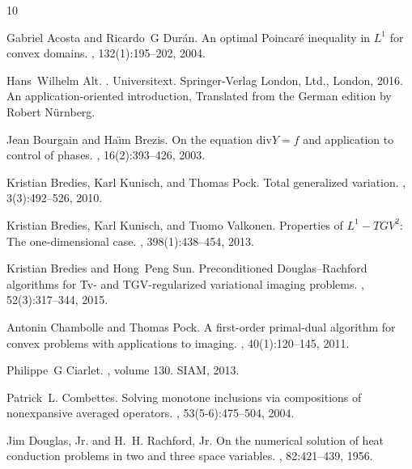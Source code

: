 \documentclass[twocolumn,envcountsame]{svjour3}
\begin{document}
\begin{thebibliography}{10}

Gabriel Acosta and Ricardo~G Dur{\'a}n.
\newblock An optimal {P}oincar{\'e} inequality in {$L^1$} for convex domains.
,
  132(1):195--202, 2004.

Hans~Wilhelm Alt.
.
\newblock Universitext. Springer-Verlag London, Ltd., London, 2016.
\newblock An application-oriented introduction, Translated from the German
  edition by Robert N\"urnberg.

Jean Bourgain and Ha{\"\i}m Brezis.
\newblock On the equation $\mathrm{div} {Y}= f$ and application to control of
  phases.
, 16(2):393--426,
  2003.

Kristian Bredies, Karl Kunisch, and Thomas Pock.
\newblock Total generalized variation.
, 3(3):492--526, 2010.

Kristian Bredies, Karl Kunisch, and Tuomo Valkonen.
\newblock Properties of {$L^1-TGV^2$}: The one-dimensional case.
,
  398(1):438--454, 2013.

Kristian Bredies and Hong~Peng Sun.
\newblock Preconditioned {D}ouglas--{R}achford algorithms for {T}v- and
  {TGV}-regularized variational imaging problems.
, 52(3):317--344,
  2015.

Antonin Chambolle and Thomas Pock.
\newblock A first-order primal-dual algorithm for convex problems with
  applications to imaging.
, 40(1):120--145,
  2011.

Philippe~G Ciarlet.
,
  volume 130.
\newblock SIAM, 2013.

Patrick~L. Combettes.
\newblock Solving monotone inclusions via compositions of nonexpansive averaged
  operators.
, 53(5-6):475--504, 2004.

Jim Douglas, Jr. and H.~H. Rachford, Jr.
\newblock On the numerical solution of heat conduction problems in two and
  three space variables.
, 82:421--439, 1956.


\end{thebibliography}
\end{document}
